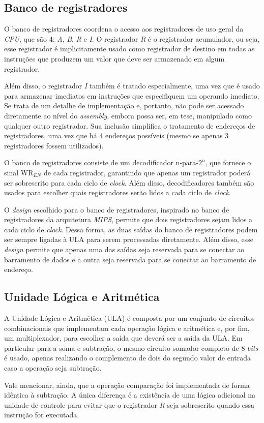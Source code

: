 \documentclass[a4paper,12pt]{report}
\begin{document}
\subsection*{Banco de registradores}

O banco de registradores coordena o acesso aos registradores de uso geral da \textit{CPU},
que são 4: \textit{A}, \textit{B}, \textit{R} e \textit{I}. O registrador \textit{R} é o 
registrador acumulador, ou seja, esse registrador é implicitamente usado como registrador de 
destino em todas as instruções que produzem um valor que deve ser armazenado em algum registrador.

Além disso, o registrador \textit{I} também é tratado especialmente, uma vez que é usado 
para armazenar imediatos em instruções que especifiquem um operando imediato. Se trata 
de um detalhe de implementação e, portanto, não pode ser acessado diretamente ao nível 
do \textit{assembly}, embora possa ser, em tese, manipulado como qualquer outro registrador. 
Sua inclusão simplifica o tratamento de endereços de registradores, uma vez que há 4 endereços 
possíveis (mesmo se apenas 3 registradores fossem utilizados).

O banco de registradores consiste de um decodificador n-para-$2^n$, que fornece o sinal 
$\textrm{WR}_{EN}$ de cada registrador, garantindo que apenas um registrador poderá ser 
sobrescrito para cada ciclo de \textit{clock}. Além disso, decodificadores também são usados
para escolher quais registradores serão lidos a cada ciclo de \textit{clock}.

O \textit{design} escolhido para o banco de registradores, inspirado no banco de registradores
da arquitetura \textit{MIPS}, permite que dois registradores sejam lidos a cada ciclo de \textit{clock}.
Dessa forma, as duas saídas do banco de registradores podem ser sempre ligadas à ULA para serem 
processadas diretamente. Além disso, esse \textit{design} permite que apenas uma das saídas seja 
reservada para se conectar ao barramento de dados e a outra seja reservada para se conectar ao 
barramento de endereço.

\subsection*{Unidade Lógica e Aritmética}

A Unidade Lógica e Aritmética (ULA) é composta por um conjunto de circuitos combinacionais que
implementam cada operação lógica e aritmética e, por fim, um multiplexador, para escolher a saída
que deverá ser a saída da ULA. Em particular para a soma e subtração, o mesmo circuito somador 
completo de 8 \textit{bits} é usado, apenas realizando o complemento de dois do segundo valor de
entrada caso a operação seja subtração. 

Vale mencionar, ainda, que a operação comparação foi implementada de forma idêntica à subtração. 
A única diferença é a existência de uma lógica adicional na unidade de controle para evitar que 
o registrador \textit{R} seja sobrescrito quando essa instrução for executada. 
\end{document}
